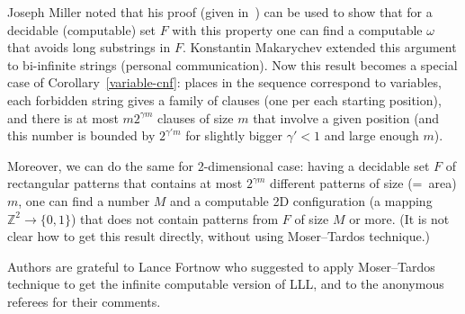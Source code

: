 \documentclass[12pt]{article}
\begin{document}
Joseph Miller noted that his proof (given in~\cite{miller-two-notes}) can be used to show that for a decidable (computable) set $F$ with this property one can find a computable $\omega$ that avoids long substrings in $F$. Konstantin Makarychev extended this argument to bi-infinite strings (personal communication). Now this result becomes a special case of Corollary~\ref{variable-cnf}: places in the sequence correspond to variables, each forbidden string gives a family of clauses (one per each starting position), and there is at most $m2^{\gamma m}$ clauses of size $m$ that involve a given position (and this number is bounded by $2^{\gamma'm}$ for slightly bigger $\gamma'<1$ and large enough $m$).

Moreover, we can do the same for 2-dimensional case: having a decidable
set $F$ of rectangular patterns that contains at most $2^{\gamma m}$ different
patterns of size (=~area) $m$, one can find a number $M$ and a computable 2D configuration (a mapping $\mathbb{Z}^2\to\{0,1\}$) that does not contain patterns from $F$ of size $M$ or more. (It is not clear how to get this result directly, without using Moser--Tardos technique.)

Authors are grateful to Lance Fortnow who suggested to apply Moser--Tardos
technique to get the infinite computable version of LLL, and to the anonymous referees for their comments.
\end{document}
